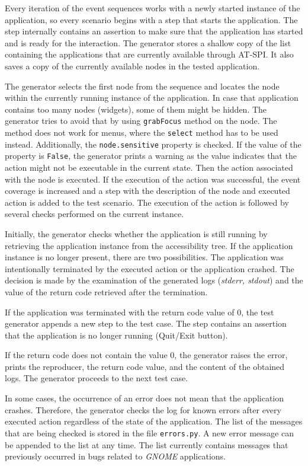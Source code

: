 Every iteration of the event sequences works with a newly started instance of the application, so every scenario begins with a step that starts the application. The step internally contains an assertion to make sure that the application has started and is ready for the interaction. The generator stores a shallow copy of the list containing the applications that are currently available through AT-SPI. It also saves a copy of the currently available nodes in the tested application. 

The generator selects the first node from the sequence and locates the node within the currently running instance of the application. In case that application contains too many nodes (widgets), some of them might be hidden. The generator tries to avoid that by using \texttt{grabFocus} method on the node. The method does not work for menus, where the \texttt{select} method has to be used instead.  Additionally, the \texttt{node.sensitive} property is checked. If the value of the property is \texttt{False}, the generator prints a warning as the value indicates that the action might not be executable in the current state. Then the action associated with the node is executed. If the execution of the action was successful, the event coverage is increased and a step with the description of the node and executed action is added to the test scenario. The execution of the action is followed by several checks performed on the current instance.

Initially, the generator checks whether the application is still running by retrieving the application instance from the accessibility tree. If the application instance is no longer present, there are two possibilities. The application was intentionally terminated by the executed action or the application crashed. The decision is made by the examination of the generated logs (\textit{stderr, stdout}) and the value of the return code retrieved after the termination.

If the application was terminated with the return code value of 0, the test generator appends a new step to the test case. The step contains an assertion that the application is no longer running (Quit/Exit button). 

If the return code does not contain the value 0, the generator raises the error, prints the reproducer, the return code value, and the content of the obtained logs. The generator proceeds to the next test case. 

In some cases, the occurrence of an error does not mean that the application crashes. Therefore, the generator checks the log for known errors after every executed action regardless of the state of the application. The list of the messages that are being checked is stored in the file \texttt{errors.py}. A new error message can be appended to the list at any time. The list currently contains messages that previously occurred in bugs related to \textit{GNOME} applications.

